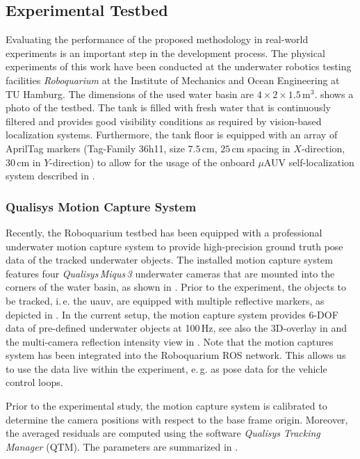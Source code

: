 \subsection{Experimental Testbed}
\label{sec:experimental-testbed}
Evaluating the performance of the proposed methodology in real-world experiments is an important step in the development process.
The physical experiments of this work have been conducted at the underwater robotics testing facilities \textit{Roboquarium} at the Institute of Mechanics and Ocean Engineering at TU Hamburg.
The dimensions of the used water basin are $4\times2\times1.5\,\mathrm{m}^3$.
 shows a photo of the testbed.
The tank is filled with fresh water that is continuously filtered and provides good visibility conditions as required by vision-based localization systems.
Furthermore, the tank floor is equipped with an array of AprilTag markers (Tag-Family 36h11, size $7.5$\,cm, $25$\,cm spacing in $X$-direction, $30$\,cm in $Y$-direction) to allow for the usage of the onboard $\mu$AUV self-localization system described in \cite{Duecker20}.





\subsubsection*{Qualisys Motion Capture System}
Recently, the Roboquarium testbed has been equipped with a professional underwater motion capture system to provide high-precision ground truth pose data of the tracked underwater objects.
The installed motion capture system features four \textit{Qualisys\,Miqus\,3} underwater cameras that are mounted into the corners of the water basin, as shown in .
Prior to the experiment, the objects to be tracked, i.\,e. the \ac{uauv}, are equipped with multiple reflective markers, as depicted in . 
In the current setup, the motion capture system provides 6-DOF data of pre-defined underwater objects at 100\,Hz, see also the 3D-overlay in  and the multi-camera reflection intensity view in .
Note that the motion captures system has been integrated into the Roboquarium ROS network.
This allows us to use the data live within the experiment, e.\,g. as pose data for the vehicle control loops.

Prior to the experimental study, the motion capture system is calibrated to determine the camera positions with respect to the base frame origin. 
Moreover, the averaged residuals are computed using the software \textit{Qualisys Tracking Manager} (QTM).
The parameters are summarized in .


